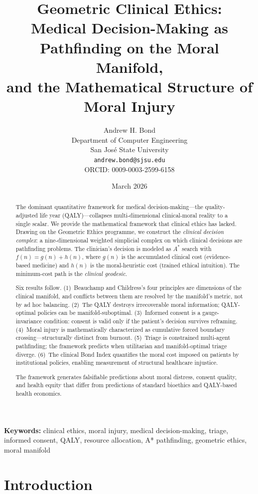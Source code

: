 \documentclass[12pt]{article}
\title{\textbf{Geometric Clinical Ethics:\\Medical Decision-Making as Pathfinding on the Moral Manifold,\\and the Mathematical Structure of Moral Injury}}
\author{Andrew H. Bond\\
Department of Computer Engineering\\
San Jos\'{e} State University\\
\texttt{andrew.bond@sjsu.edu}\\
ORCID: 0009-0003-2599-6158}
\date{March 2026}
\theoremstyle{definition}
\theoremstyle{remark}
\begin{document}
\maketitle

\noindent\textbf{Keywords:} clinical ethics, moral injury, medical decision-making, triage, informed consent, QALY, resource allocation, A* pathfinding, geometric ethics, moral manifold

\begin{abstract}
The dominant quantitative framework for medical decision-making---the quality-adjusted life year (QALY)---collapses multi-dimensional clinical-moral reality to a single scalar.  We provide the mathematical framework that clinical ethics has lacked.  Drawing on the Geometric Ethics programme, we construct the \emph{clinical decision complex}: a nine-dimensional weighted simplicial complex on which clinical decisions are pathfinding problems.  The clinician's decision is modeled as $A^*$ search with $f(n) = g(n) + h(n)$, where $g(n)$ is the accumulated clinical cost (evidence-based medicine) and $h(n)$ is the moral-heuristic cost (trained ethical intuition).  The minimum-cost path is the \emph{clinical geodesic}.

Six results follow.  (1)~Beauchamp and Childress's four principles are dimensions of the clinical manifold, and conflicts between them are resolved by the manifold's metric, not by ad hoc balancing.  (2)~The QALY destroys irrecoverable moral information; QALY-optimal policies can be manifold-suboptimal.  (3)~Informed consent is a gauge-invariance condition: consent is valid only if the patient's decision survives reframing.  (4)~Moral injury is mathematically characterized as cumulative forced boundary crossing---structurally distinct from burnout.  (5)~Triage is constrained multi-agent pathfinding; the framework predicts when utilitarian and manifold-optimal triage diverge.  (6)~The clinical Bond Index quantifies the moral cost imposed on patients by institutional policies, enabling measurement of structural healthcare injustice.

The framework generates falsifiable predictions about moral distress, consent quality, and health equity that differ from predictions of standard bioethics and QALY-based health economics.
\end{abstract}

\section{Introduction}
\label{sec:intro}
\end{document}
